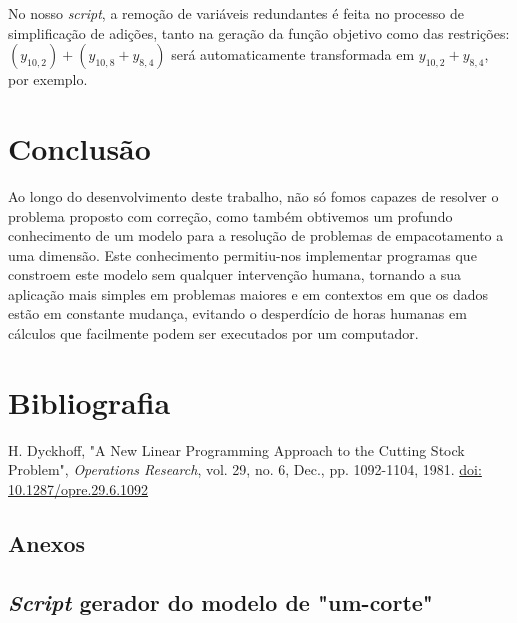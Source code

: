 \documentclass[12pt, a4paper, titlepage]{article}
\begin{document}
No nosso \emph{script}, a remoção de variáveis redundantes é feita no processo de simplificação de
adições, tanto na geração da função objetivo como das restrições:
$(y_{10, 2}) + (y_{10, 8} + y_{8, 4})$ será automaticamente transformada em $y_{10, 2} + y_{8, 4}$,
por exemplo.

\section{Conclusão}

Ao longo do desenvolvimento deste trabalho, não só fomos capazes de resolver o problema proposto
com correção, como também obtivemos um profundo conhecimento de um modelo para a resolução de
problemas de empacotamento a uma dimensão. Este conhecimento permitiu-nos implementar programas que
constroem este modelo sem qualquer intervenção humana, tornando a sua aplicação mais simples em
problemas maiores e em contextos em que os dados estão em constante mudança, evitando o desperdício
de horas humanas em cálculos que facilmente podem ser executados por um computador.

\section{Bibliografia}
\def\refname{}
\vspace{-1.5cm}
\begin{thebibliography}{9}
    H. Dyckhoff, "A New Linear Programming Approach to the Cutting Stock Problem",
    \emph{Operations Research}, vol. 29, no. 6, Dec., pp. 1092-1104, 1981.
    \href{https://doi.org/10.1287/opre.29.6.1092}{doi: 10.1287/opre.29.6.1092}
\end{thebibliography}

\begin{landscape}
    \section{Anexos}

    \subsection{\emph{Script} gerador do modelo de "um-corte"{}}
    \label{code:one-cut}
    
    \pagebreak
\end{landscape}
\end{document}
